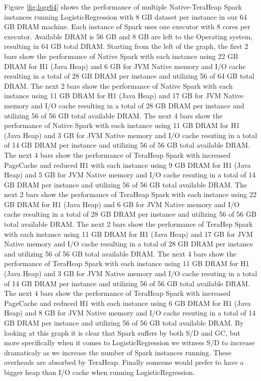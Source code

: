 Figure \ref{fig:logr64} shows the performance of multiple Native-TeraHeap
Spark instances running LogisticRegression with 8 GB dataset per
instance in our 64 GB DRAM machine. Each instance of Spark uses one
executor with 8 cores per executor. Available DRAM is 56 GB and 8 GB
are left to the Operating system, resulting in 64 GB total DRAM.
Starting from the left of the graph, the first 2 bars show the
performance of Native Spark with each instance using 22 GB DRAM for H1
(Java Heap) and 6 GB for JVM Native memory and I/O cache resulting in
a total of 28 GB DRAM per instance and utilizing 56 of 64 GB total
DRAM. The next 2 bars show the performance of Native Spark with each
instance using 11 GB DRAM for H1 (Java Heap) and 17 GB for JVM Native
memory and I/O cache resulting in a total of 28 GB DRAM per instance
and utilizing 56 of 56 GB total available DRAM. The next 4 bars show
the performance of Native Spark with each instance using 11 GB DRAM
for H1 (Java Heap) and 3 GB for JVM Native memory and I/O cache
resuting in a total of 14 GB DRAM per instance and utilizing 56 of 56
GB total available DRAM. The next 4 bars show the performance of
TeraHeap Spark with increased PageCache and reduced H1 with each
instance using 9 GB DRAM for H1 (Java Heap) and 5 GB for JVM Native
memory and I/O cache resuting in a total of 14 GB DRAM per instance
and utilizing 56 of 56 GB total available DRAM. The next 2 bars show
the performance of TeraHeap Spark with each instance using 22 GB DRAM
for H1 (Java Heap) and 6 GB for JVM Native memory and I/O cache
resulting in a total of 28 GB DRAM per instance and utilizing 56 of 56
GB total available DRAM. The next 2 bars show the performance of
TeraHep Spark with each instance using 11 GB DRAM for H1 (Java Heap)
and 17 GB for JVM Native memory and I/O cache resulting in a total of
28 GB DRAM per instance and utilizing 56 of 56 GB total available
DRAM. The next 4 bars show the performance of TeraHeap Spark with each
instance using 11 GB DRAM for H1 (Java Heap) and 3 GB for JVM Native
memory and I/O cache resuting in a total of 14 GB DRAM per instance
and utilizing 56 of 56 GB total available DRAM. The next 4 bars show
the performance of TeraHeap Spark with increased PageCache and reduced
H1 with each instance using 6 GB DRAM for H1 (Java Heap) and 8 GB for
JVM Native memory and I/O cache resuting in a total of 14 GB DRAM per
instance and utilizing 56 of 56 GB total available DRAM.  By looking
at this graph it is clear that Spark suffers by both S/D and GC, but
more specifically when it comes to LogisticRegression we witness S/D
to increase dramaticaly as we increase the number of Spark instances
running. These overheads are absorbed by TeraHeap. Finally someone
would prefer to have a bigger heap than I/O cache when running
LogisticRegression.

